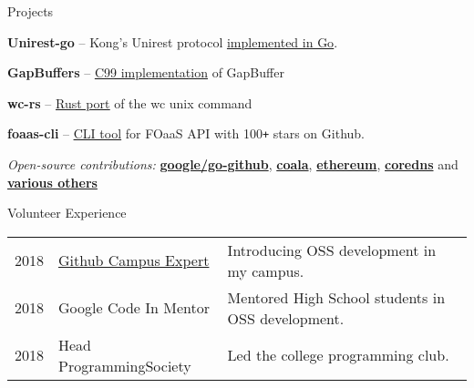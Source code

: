 \documentclass{resume} %
\begin{document}

\begin{rSection}{Projects}
  \begin{rProjectSection}
    \item \textbf {Unirest-go} -- Kong's Unirest protocol \href{https://github.com/kurafs/kura}{\underline{implemented in Go}}.
    \item \textbf {GapBuffers} -- \href{https://github.com/palash25/GapBuffer}{\underline{C99 implementation}} of GapBuffer
    \item \textbf {wc-rs} -- \href{https://github.com/palash25/wc-rs}{\underline{Rust port}} of the wc unix command
    \item \textbf {foaas-cli} -- \href{https://github.com/palash25/foaas-cli}{\underline{CLI tool}} for FOaaS API with 100\texttt{+} stars on Github.
  \end{rProjectSection}

  \begin{rBlurbSection}
    \item {\em Open-source contributions:}
      \href{http://bit.ly/2LfMLIW}{\textbf{google/go-github}},
      \href{http://bit.ly/2Quw26G}{\textbf{coala}},
      \href{http://bit.ly/2NLmHsD}{\textbf{ethereum}},
      \href{https://github.com/coredns/coredns/pull/3011}{\textbf{coredns}} and
      \href{http://bit.ly/2lJ4PCy}{\textbf{various others}}
  \end{rBlurbSection}
\end{rSection}


\begin{rSection}{Volunteer Experience}
  \begin{tabular}{rll}
2018	     & {\href{http://bit.ly/2OsNuqI}{Github Campus Expert}}  & Introducing OSS development in my campus.\\
2018	     & Google Code In Mentor  & Mentored High School students in OSS development.\\
2018	     & Head ProgrammingSociety  & Led the college programming club.\\
\end{tabular}
\end{rSection}
\end{document}
